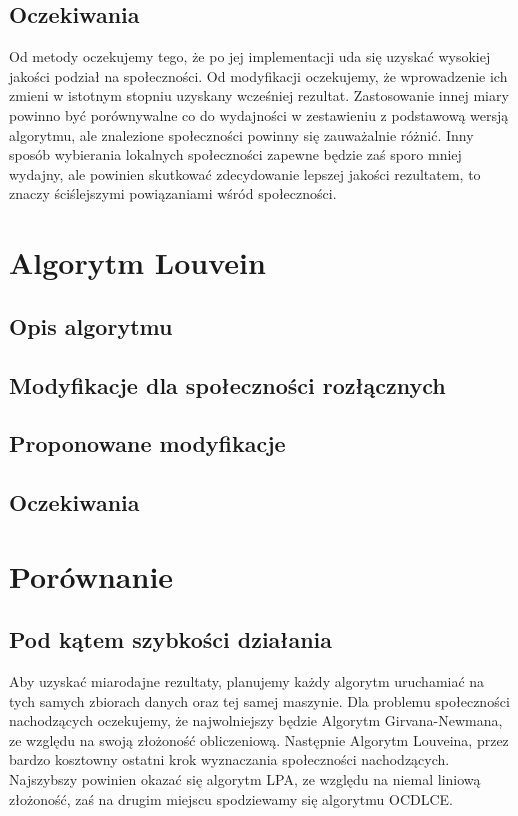 \documentclass{article}
\begin{document}
\subsection{Oczekiwania}
Od metody oczekujemy tego, że po jej implementacji uda się uzyskać wysokiej jakości podział na społeczności. Od modyfikacji oczekujemy, że wprowadzenie ich zmieni w istotnym stopniu uzyskany wcześniej rezultat. Zastosowanie innej miary powinno być porównywalne co do wydajności w zestawieniu z podstawową wersją algorytmu, ale znalezione społeczności powinny się zauważalnie różnić. Inny sposób wybierania lokalnych społeczności zapewne będzie zaś sporo mniej wydajny, ale powinien skutkować zdecydowanie lepszej jakości rezultatem, to znaczy ściślejszymi powiązaniami wśród społeczności.
\newpage
\section{Algorytm Louvein}
\subsection{Opis algorytmu}
\subsection{Modyfikacje dla społeczności rozłącznych}
\subsection{Proponowane modyfikacje}
\subsection{Oczekiwania}

\newpage
\section{Porównanie}
\subsection{Pod kątem szybkości działania}
Aby uzyskać miarodajne rezultaty, planujemy każdy algorytm uruchamiać na tych samych zbiorach danych oraz tej samej maszynie. Dla problemu społeczności nachodzących oczekujemy, że najwolniejszy będzie Algorytm Girvana-Newmana, ze względu na swoją złożoność obliczeniową. Następnie Algorytm Louveina, przez bardzo kosztowny ostatni krok wyznaczania społeczności nachodzących. Najszybszy powinien okazać się algorytm LPA, ze względu na niemal liniową złożoność, zaś na drugim miejscu spodziewamy się algorytmu OCDLCE.
\end{document}

